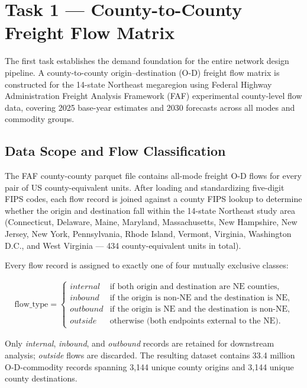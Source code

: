 
\section{Task 1 — County-to-County Freight Flow Matrix}

The first task establishes the demand foundation for the entire network design pipeline.
A county-to-county origin--destination (O-D) freight flow matrix is constructed for the
14-state Northeast megaregion using Federal Highway Administration Freight Analysis
Framework (FAF) experimental county-level flow data, covering 2025 base-year estimates
and 2030 forecasts across all modes and commodity groups.

\subsection{Data Scope and Flow Classification}

The FAF county-county parquet file contains all-mode freight O-D flows for every pair
of US county-equivalent units. After loading and standardizing five-digit FIPS codes,
each flow record is joined against a county FIPS lookup to determine whether the origin
and destination fall within the 14-state Northeast study area (Connecticut, Delaware,
Maine, Maryland, Massachusetts, New Hampshire, New Jersey, New York, Pennsylvania,
Rhode Island, Vermont, Virginia, Washington D.C., and West Virginia — 434
county-equivalent units in total).

Every flow record is assigned to exactly one of four mutually exclusive classes:

\begin{align}
\text{flow\_type} = \begin{cases}
\textit{internal}  & \text{if both origin and destination are NE counties,}\\
\textit{inbound}   & \text{if the origin is non-NE and the destination is NE,}\\
\textit{outbound}  & \text{if the origin is NE and the destination is non-NE,}\\
\textit{outside}   & \text{otherwise (both endpoints external to the NE).}
\end{cases}
\end{align}

Only \textit{internal}, \textit{inbound}, and \textit{outbound} records are retained for
downstream analysis; \textit{outside} flows are discarded. The resulting dataset contains
33.4 million O-D-commodity records spanning 3{,}144 unique county origins and 3{,}144
unique county destinations.

